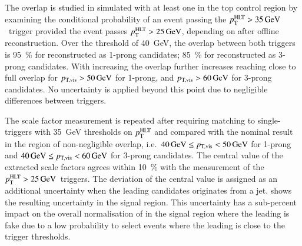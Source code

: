 The overlap is studied in simulated \ttbar with at least one
\faketauhadvis in the top control region by examining the
conditional probability of an event passing the
$\pTHLT > \SI{35}{\GeV}$~trigger provided the event passes
$\pTHLT > \SI{25}{\GeV}$, depending on \pTvis after offline \tauhadvis
reconstruction. Over the \pTvis threshold of \SI{40}{\GeV}, the
overlap between both triggers is \SI{95}{\percent} for \faketauhadvis
reconstructed as 1-prong candidates; \SI{85}{\percent} for
\faketauhadvis reconstructed as 3-prong candidates.  With
increasing \pTvis the overlap further increases reaching close to full
overlap for $p_\text{T,vis} > \SI{50}{\ensuremath{\text{GeV}}}$ for 1-prong, and
$p_\text{T,vis} > \SI{60}{\ensuremath{\text{GeV}}}$ for 3-prong candidates. No uncertainty is
applied beyond this point due to negligible differences between
triggers.

The scale factor measurement is repeated after requiring matching to
single-\tauhadvis triggers with \SI{35}{\GeV} thresholds on $p_{\text{T}}^{\text{HLT}}$
and compared with the nominal result in the region of non-negligible
overlap, i.e.\ $\SI{40}{\ensuremath{\text{GeV}}} \leq p_\text{T,vis} < \SI{50}{\ensuremath{\text{GeV}}}$ for 1-prong
and $\SI{40}{\ensuremath{\text{GeV}}} \leq p_\text{T,vis} < \SI{60}{\ensuremath{\text{GeV}}}$ for 3-prong
candidates. The central value of the extracted scale factors agrees
within \SI{10}{\percent} with the measurement of the
$\pTHLT > \SI{25}{\GeV}$~triggers. The deviation of the central value
is assigned as an additional uncertainty when the leading \tauhadvis
candidates originates from a
jet.  shows the resulting
uncertainty in the \hadhad signal region. This uncertainty has a sub-percent impact on the overall
normalisation of \ttbar in the signal region where the leading
\tauhadvis is fake due to a low probability to select events where the
leading \tauhadvis is close to the trigger thresholds.


\begin{table}[htbp]
  \centering

  \caption{Uncertainty based on the comparison of scale factors
    measured for triggers with $\pTHLT > \SI{25}{\GeV}$ and
    $\pTHLT > \SI{35}{\GeV}$. The impact on the normalisation of
    \ttbar with a leading \tauhadvis candidate originating from jets
    and \pTvis close to the threshold of \SI{40}{\GeV} is shown.}%
  \label{tab:ttbarSF_tau25_35_uncertainty}

  
\end{table}

